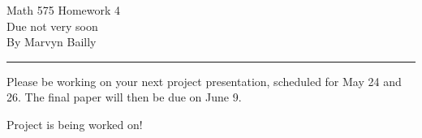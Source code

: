 \documentclass[12pt]{report}
\begin{document}
\large

\begin{center}
 Math 575 Homework 4\\
 Due not very soon\\
 By Marvyn Bailly\\
\end{center}

\normalsize

\hrule



\begin{problem}
    Please be working on your next project presentation, scheduled for May 24 and 26.   The final paper will then be due on June 9. 
\end{problem}

\begin{solution}
    \noindent
    Project is being worked on!
\end{solution}

\newpage


\end{document}
